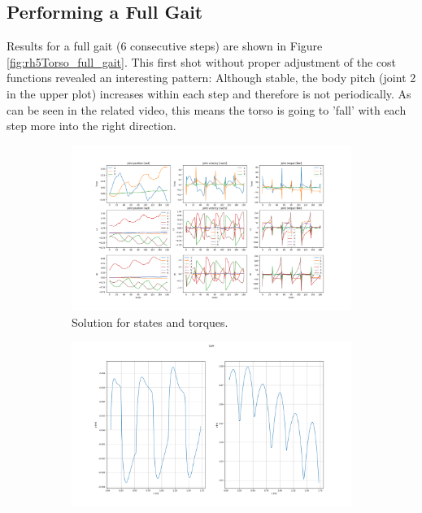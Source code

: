\subsection{Performing a Full Gait}
Results for a full gait (6 consecutive steps) are shown in Figure \ref{fig:rh5Torso_full_gait}. This first shot without proper adjustment of the cost functions revealed an interesting pattern: Although stable, the body pitch (joint 2 in the upper plot) increases within each step and therefore is not periodically. As can be seen in the related video, this means the torso is going to 'fall' with each step more into the right direction. 
\begin{figure}[h!]
\centering
\begin{subfigure}{.5\textwidth}
  \centering
  \includegraphics[width=1\linewidth]{Media/Crocoddyl/RH5Torso/RH5TorsoGait_Solution.png}
  \caption{Solution for states and torques.}
\end{subfigure}
\begin{subfigure}{.5\textwidth}
  \centering
\includegraphics[width=1\linewidth]{Media/Crocoddyl/RH5Torso/RH5TorsoGait_CoM2.png}

\end{subfigure}
\end{figure}

